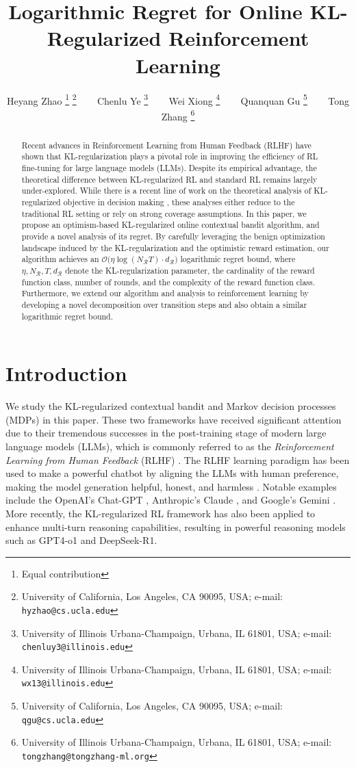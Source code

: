 \documentclass[11pt]{article}
\title{\huge Logarithmic Regret for Online KL-Regularized Reinforcement Learning}
\author{Heyang Zhao \thanks{Equal contribution} \thanks{University of California, Los Angeles, CA 90095, USA; e-mail: {\tt hyzhao@cs.ucla.edu}}
~~~
Chenlu Ye \footnotemark[1] \thanks{University of Illinois Urbana-Champaign, Urbana, IL 61801, USA; e-mail: {\tt chenluy3@illinois.edu}}
~~~
Wei Xiong \thanks{University of Illinois Urbana-Champaign, Urbana, IL 61801, USA; e-mail: {\tt wx13@illinois.edu}}
~~~
Quanquan Gu \thanks{University of California, Los Angeles, CA 90095, USA; e-mail: {\tt qgu@cs.ucla.edu}}
~~~
Tong Zhang \thanks{University of Illinois Urbana-Champaign, Urbana, IL 61801, USA; e-mail: {\tt tongzhang@tongzhang-ml.org}}
}
\date{}
\begin{document}
\maketitle

\begin{abstract}
    Recent advances in Reinforcement Learning from Human Feedback (RLHF) have shown that KL-regularization plays a pivotal role in improving the efficiency of RL fine-tuning for large language models (LLMs). Despite its empirical advantage, the theoretical difference between KL-regularized RL and standard RL remains largely under-explored. While there is a recent line of work on the theoretical analysis of KL-regularized objective in decision making \citep{xiong2024iterative, xie2024exploratory,zhao2024sharp}, these analyses either reduce to the traditional RL setting or rely on strong coverage assumptions. In this paper, we propose an optimism-based KL-regularized online contextual bandit algorithm, and provide a novel analysis of its regret. By carefully leveraging the benign optimization landscape induced by the KL-regularization and the optimistic reward estimation, our algorithm achieves an $\mathcal{O}\big(\eta\log (N_{\mathcal R} T)\cdot d_{\mathcal R}\big)$ logarithmic regret bound, where $\eta, N_{\mathcal R},T,d_{\mathcal R}$ denote the KL-regularization parameter, the cardinality of the reward function class, number of rounds, and the complexity of the reward function class. Furthermore, we extend our algorithm and analysis to reinforcement learning by developing a novel decomposition over transition steps and also obtain a similar logarithmic regret bound.
\end{abstract}

\section{Introduction}
We study the KL-regularized contextual bandit \citep{langford2007epoch, xiong2024iterative} and Markov decision processes (MDPs) \citep{sutton2018reinforcement} in this paper. These two frameworks have received significant attention due to their tremendous successes in the post-training stage of modern large language models (LLMs), which is commonly referred to as the \textit{Reinforcement Learning from Human Feedback} (RLHF) \citep{bai2022training, ouyang2022training}. The RLHF learning paradigm has been used to make a powerful chatbot by aligning the LLMs with human preference, making the model generation helpful, honest, and harmless \citep{bai2022training}. Notable examples include the OpenAI's Chat-GPT \citep{OpenAI2023GPT4TR}, Anthropic's Claude \citep{bai2022training}, and Google's Gemini \citep{team2023gemini}. More recently, the KL-regularized RL framework has also been applied to enhance multi-turn reasoning capabilities, resulting in powerful reasoning models such as GPT4-o1 and DeepSeek-R1.
\end{document}
